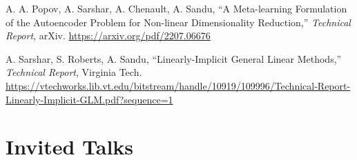 \documentclass[11pt,letterpaper]{report}
\newcommand{\paperinfo}[5]{
    \tab{}
    #1, %
    \enquote{#2,} %
    \textit{#3}, %
    #4. %
    \href{#5}{#5} %
}
\begin{document}
    \begin{tablist}
        \item[2022] \paperinfo{A. A. Popov, A. Sarshar, A. Chenault, A. Sandu}
                                {A Meta-learning Formulation of the Autoencoder Problem for Non-linear Dimensionality Reduction}
                                {Technical Report}
                                {arXiv}
                                {https://arxiv.org/pdf/2207.06676}

        \item[2019] \paperinfo{A. Sarshar, S. Roberts, A. Sandu}
                                {Linearly-Implicit General Linear Methods}
                                {Technical Report}
                                {Virginia Tech}
                                {https://vtechworks.lib.vt.edu/bitstream/handle/10919/109996/Technical-Report-Linearly-Implicit-GLM.pdf?sequence=1}
    \end{tablist}









    \section*{Invited Talks}
\end{document}
